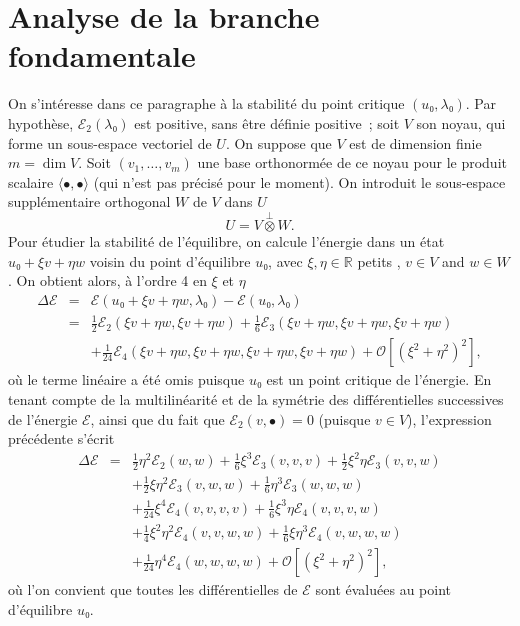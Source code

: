 \documentclass{article}
\begin{document}
\section{Analyse de la branche fondamentale}

On s'intéresse dans ce paragraphe à la stabilité du point critique
$(u₀, λ₀) .$ Par hypothèse, $ℰ_2 (λ₀)$ est
positive, sans être définie positive~; soit $V$ son noyau, qui forme
un sous-espace vectoriel de $U$. On suppose que $V$ est de dimension finie $m
= \dim V$. Soit $(v_1, \ldots, v_m)$ une base orthonormée de ce noyau pour
le produit scalaire $\langle \bullet, \bullet \rangle$ (qui n'est pas
précisé pour le moment). On introduit le sous-espace
supplémentaire orthogonal $W$ de $V$ dans $U$
\begin{equation}
  U = V \overset{\perp}{\otimes} W.
\end{equation}
Pour étudier la stabilité de l'équilibre, on calcule l'énergie
dans un état $u₀ + ξ v + η w$ voisin du point d'équilibre $u₀$,
avec $ξ, η∈\mathbb{R}$ {\guillemotleft} petits {\guillemotright}, $v
\in V$ and $w∈W$. On obtient alors, à l'ordre 4 en $ξ$ et $η$
\begin{eqnarray}
  \Delta ℰ & = & ℰ (u₀ + ξ v + η w, λ₀)
  -ℰ (u₀, λ₀) \nonumber\\
  & = & \tfrac{1}{2} ℰ_2 (ξ v + η w, ξ v + η w) +
  \tfrac{1}{6} ℰ_3 (ξ v + η w, ξ v + η w, ξ v + η w)
  \nonumber\\
  &  &  + \tfrac{1}{24} ℰ_4 (ξ v + η w, ξ v + η
  w, ξ v + η w, ξ v + η w) +\mathcal{O} [(ξ^2 + η^2)^2],
\end{eqnarray}
où le terme linéaire a été omis puisque $u₀$ est un point
critique de l'énergie. En tenant compte de la multilinéarité et de
la symétrie des différentielles successives de l'énergie
$ℰ$, ainsi que du fait que $ℰ_2 (v, \bullet) = 0$ (puisque
$v∈V$), l'expression précédente s'écrit
\begin{eqnarray}
  \Delta ℰ & = & \tfrac{1}{2} η^2 ℰ_2 (w, w) +
  \tfrac{1}{6} ξ^3 ℰ_3 (v, v, v) + \tfrac{1}{2} ξ^2 η
  ℰ_3 (v, v, w) \nonumber\\
  &  & + \tfrac{1}{2} ξ η^2 ℰ_3 (v, w, w) + \tfrac{1}{6}
  η^3 ℰ_3 (w, w, w) \nonumber\\
  &  & + \tfrac{1}{24} ξ^4 ℰ_4 (v, v, v, v) + \tfrac{1}{6} ξ^3
  η ℰ_4 (v, v, v, w) \nonumber\\
  &  & + \tfrac{1}{4} ξ^2 η^2 ℰ_4 (v, v, w, w) + \tfrac{1}{6}
  ξ η^3 ℰ_4 (v, w, w, w) \nonumber\\
  &  & + \tfrac{1}{24} η^4 ℰ_4 (w, w, w, w) +\mathcal{O} [(ξ^2
  + η^2)^2],
\end{eqnarray}
où l'on convient que toutes les différentielles de $ℰ$ sont
évaluées au point d'équilibre $u₀$.
\end{document}
